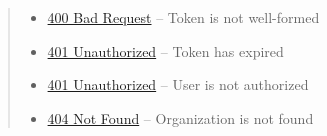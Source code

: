 \documentclass[letterpaper,10pt,english]{sphinxmanual}
\begin{document}
\begin{fulllineitems}
\begin{quote}
\begin{description}
\begin{itemize}
\item {} 
\href{http://www.w3.org/Protocols/rfc2616/rfc2616-sec10.html\#sec10.4.1}{400 Bad Request} -- Token is not well-formed

\item {} 
\href{http://www.w3.org/Protocols/rfc2616/rfc2616-sec10.html\#sec10.4.2}{401 Unauthorized} -- Token has expired

\item {} 
\href{http://www.w3.org/Protocols/rfc2616/rfc2616-sec10.html\#sec10.4.2}{401 Unauthorized} -- User is not authorized

\item {} 
\href{http://www.w3.org/Protocols/rfc2616/rfc2616-sec10.html\#sec10.4.5}{404 Not Found} -- Organization is not found

\end{itemize}

\end{description}\end{quote}

\end{fulllineitems}
\end{document}
